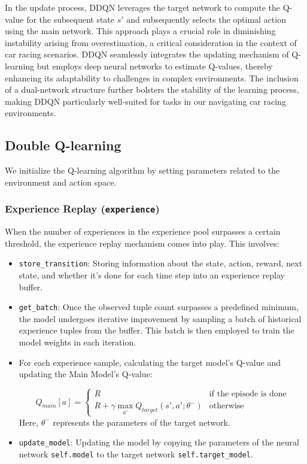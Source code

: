\documentclass{article}
\begin{document}
In the update process, DDQN leverages the target network to compute the Q-value for the subsequent state \(s'\) and subsequently selects the optimal action using the main network. This approach plays a crucial role in diminishing instability arising from overestimation, a critical consideration in the context of car racing scenarios. DDQN seamlessly integrates the updating mechanism of Q-learning but employs deep neural networks to estimate Q-values, thereby enhancing its adaptability to challenges in complex environments. The inclusion of a dual-network structure further bolsters the stability of the learning process, making DDQN particularly well-suited for tasks in our navigating car racing environments.

\subsection{Double Q-learning}

We initialize the Q-learning algorithm by setting parameters related to the environment and action space.

\subsubsection{Experience Replay (\texttt{experience})}

When the number of experiences in the experience pool surpasses a certain threshold, the experience replay mechanism comes into play. This involves:

\begin{itemize}
    \item \texttt{store\_transition}: Storing information about the state, action, reward, next state, and whether it's done for each time step into an experience replay buffer.
    \item \texttt{get\_batch}: Once the observed tuple count surpasses a predefined minimum, the model undergoes iterative improvement by sampling a batch of historical experience tuples from the buffer. This batch is then employed to train the model weights in each iteration.
    \item For each experience sample, calculating the target model's Q-value and updating the Main Model's Q-value:
    
    \[
    Q_{main}[a] = \begin{cases}
    R & \text{if the episode is done} \\
    R + \gamma \max_{a'} Q_{target}(s', a'; \theta^-) & \text{otherwise}
    \end{cases}
    \]
        Here, $\theta^-$ represents the parameters of the target network.
    \item \texttt{update\_model}: Updating the model by copying the parameters of the neural network \texttt{self.model} to the target network \texttt{self.target\_model}.
    
\end{itemize}
\end{document}
